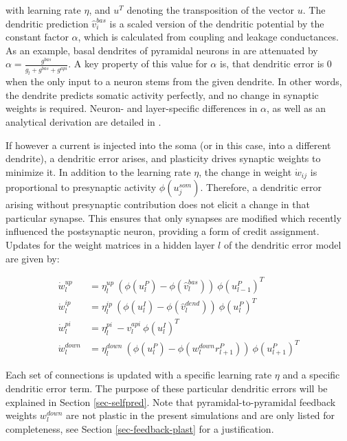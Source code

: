 with learning rate $\eta$, and $u^T$ denoting the transposition of the vector $u$. The dendritic prediction
$\hat{v}_i^{bas}$ is a scaled version of the dendritic potential by the constant factor $\alpha$, which is calculated
from coupling and leakage conductances. As an example, basal dendrites of pyramidal neurons in
\citep{sacramento2018dendritic} are attenuated by $\alpha = \frac{g^{bas}}{g_l + g^{bas} + g^{api}}$. A key property of
this value for $\alpha$ is, that dendritic error is $0$ when the only input to a neuron stems from the given dendrite.
In other words, the dendrite predicts somatic activity perfectly, and no change in synaptic weights is required. Neuron-
and layer-specific differences in $\alpha$, as well as an analytical derivation are detailed in
\citep{sacramento2018dendritic}.

If however a current is injected into the soma (or in this case, into a different dendrite), a dendritic error arises,
and plasticity drives synaptic weights to minimize it. In addition to the learning rate $\eta$, the change in weight
$\dot{w}_{ij}$ is proportional to presynaptic activity $\phi(u_j^{som})$. Therefore, a dendritic error arising without
presynaptic contribution does not elicit a change in that particular synapse. This ensures that only synapses are
modified which recently influenced the postsynaptic neuron, providing a form of credit assignment. Updates for the
weight matrices in a hidden layer $l$ of the dendritic error model are given by:

\begin{align}
  \dot{w}_{l}^{up}   & = \eta_l^{up} \ ( \phi(u_l^{P}) - \phi(\hat{v}_l^{bas}) ) \ \phi(u_{l-1}^{P})^T\label{eq-delta_w_up}         \\
  \dot{w}_{l}^{ip}   & = \eta_l^{ip} \ ( \phi(u_l^{I}) - \phi(\hat{v}_l^{dend}) ) \ \phi(u_{l}^{P})^T\label{eq-delta_w_ip}          \\
  \dot{w}_{l}^{pi}   & = \eta_l^{pi} \ - v_l^{api} \ \phi(u_l^{I})^T\label{eq-delta_w_pi}                                           \\
  \dot{w}_{l}^{down} & = \eta_l^{down} \ ( \phi(u_l^{P}) - \phi(w_l^{down} r_{l+1}^P) )\ \phi(u_{l+1}^{P})^T\label{eq-delta_w_down}
\end{align}

Each set of connections is updated with a specific learning rate $\eta$ and a specific dendritic error term. The purpose
of these particular dendritic errors will be explained in Section \ref{sec-selfpred}. Note that pyramidal-to-pyramidal
feedback weights $w_l^{down}$ are not plastic in the present simulations and are only listed for completeness, see
Section \ref{sec-feedback-plast} for a justification.

